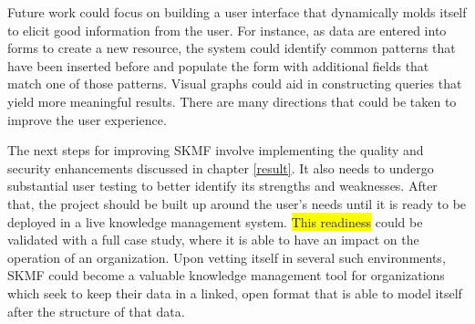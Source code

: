 Future work could focus on building a user interface that dynamically molds itself to elicit good information from the user. For instance, as data are entered into forms to create a new resource, the system could identify common patterns that have been inserted before and populate the form with additional fields that match one of those patterns. Visual graphs could aid in constructing queries that yield more meaningful results. There are many directions that could be taken to improve the user experience.

The next steps for improving SKMF involve implementing the quality and security enhancements discussed in chapter
\ref{result}.
It also needs to undergo substantial user testing to better identify its strengths and weaknesses. After that, the project should be built up around the user's needs until it is ready to be deployed in a live knowledge management system.
\colorbox{yellow}{This readiness}
could be validated with a full case study, where it is able to have an impact on the operation of an organization. Upon vetting itself in several such environments, SKMF could become a valuable knowledge management tool for organizations which seek to keep their data in a linked, open format that is able to model itself after the structure of that data.
